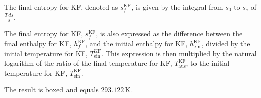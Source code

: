 The final entropy for KF, denoted as \( s_{f}^{\text{KF}} \), is given by the integral from \( s_{0} \) to \( s_{e} \) of \( \frac{T \, ds}{s} \).

The final entropy for KF, \( s_{f}^{\text{KF}} \), is also expressed as the difference between the final enthalpy for KF, \( h_{f}^{\text{KF}} \), and the initial enthalpy for KF, \( h_{\text{ein}}^{\text{KF}} \), divided by the initial temperature for KF, \( T_{\text{ein}}^{\text{KF}} \). This expression is then multiplied by the natural logarithm of the ratio of the final temperature for KF, \( T_{\text{aus}}^{\text{KF}} \), to the initial temperature for KF, \( T_{\text{ein}}^{\text{KF}} \).

The result is boxed and equals \( 293.122 \, \text{K} \).
